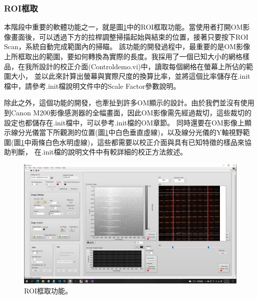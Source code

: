 \documentclass[12pt]{article}
\begin{document}
    \subsubsection{ROI框取}
    本階段中重要的軟體功能之一，就是圖\ref{figure: roi}中的ROI框取功能。當使用者打開OM影像畫面後，可以透過下方的拉桿調整掃描起始與結束的位置，接著只要按下ROI Scan，系統自動完成範圍內的掃瞄。
    該功能的開發過程中，最重要的是OM影像上所框取出的範圍，要如何轉換為實際的長度。我採用了一個已知大小的網格樣品，在我所設計的校正介面(Control\textunderscore demo.vi)中，讀取每個網格在螢幕上所佔的範圍大小，
    並以此來計算出螢幕與實際尺度的換算比率，並將這個比率儲存在.init檔中，請參考.init檔說明文件中的Scale Factor參數說明。

    除此之外，這個功能的開發，也牽扯到許多OM顯示的設計。由於我們並沒有使用到Canon M200影像感測器的全幅畫面，因此OM影像需先經過裁切，這些裁切的設定也都儲存在.init檔中，可以參考.init檔的OM章節。
    同時還要在OM影像上顯示線分光儀當下所觀測的位置(圖\ref{figure: roi}中白色垂直虛線)，以及線分光儀的Y軸視野範圍(圖\ref{figure: roi}中兩條白色水明虛線)，這些都需要以校正介面與具有已知特徵的樣品來協助判斷，
    在.init檔的說明文件中有較詳細的校正方法敘述。
    \begin{figure}
        \centering
        \includegraphics[width=\linewidth]{roi.jpeg}
        \caption{ROI框取功能。}
        \label{figure: roi}
    \end{figure}
\end{document}
